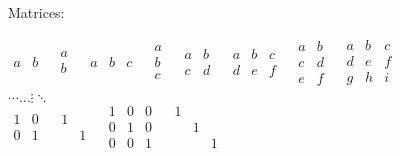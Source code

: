 \documentclass[12pt,a4paper]{article}
\begin{document}
Matrices:\textbf{ }

$\begin{matrix}
a & b & \\
\end{matrix}
\begin{matrix}
a & \\
b & \\
\end{matrix}
\begin{matrix}
a & b & c & \\
\end{matrix}
\begin{matrix}
a & \\
b & \\
c & \\
\end{matrix}
\begin{matrix}
a & b & \\
c & d & \\
\end{matrix}
\begin{matrix}
a & b & c & \\
d & e & f & \\
\end{matrix}
\begin{matrix}
a & b & \\
c & d & \\
e & f & \\
\end{matrix}
\begin{matrix}
a & b & c & \\
d & e & f & \\
g & h & i & \\
\end{matrix}
$\\


$\cdots \ldots \vdots \ddots $\\


$\begin{matrix}
1 & 0 & \\
0 & 1 & \\
\end{matrix}
\begin{matrix}
1 & & \\
 & 1 & \\
\end{matrix}
\begin{matrix}
1 & 0 & 0 & \\
0 & 1 & 0 & \\
0 & 0 & 1 & \\
\end{matrix}
\begin{matrix}
1 & & & \\
 & 1 & & \\
 & & 1 & \\
\end{matrix}
$\\
\end{document}
